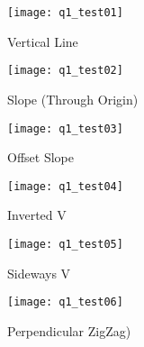 			\begin{figure}[position = here]
				\begin{centering}
					\texttt{[image: q1\_test01]}\\
					\caption[\textit{RPYAxes}]{Vertical Line}
				\end{centering}
			\end{figure}
			\newline
			
			\begin{figure}[position = here]
				\begin{centering}
					\texttt{[image: q1\_test02]}\\
					\caption[\textit{RPYAxes}]{Slope (Through Origin)}
				\end{centering}
			\end{figure}
			\newline
			
			\begin{figure}[position = here]
				\begin{centering}
					\texttt{[image: q1\_test03]}\\
					\caption[\textit{RPYAxes}]{Offset Slope}
				\end{centering}
			\end{figure}
			\newline
			
			\begin{figure}[position = here]
				\begin{centering}
					\texttt{[image: q1\_test04]}\\
					\caption[\textit{RPYAxes}]{Inverted V}
				\end{centering}
			\end{figure}
			\newline			
			
			\begin{figure}[position = here]
				\begin{centering}
					\texttt{[image: q1\_test05]}\\
					\caption[\textit{RPYAxes}]{Sideways V}
				\end{centering}
			\end{figure}
			\newline			
			
			\begin{figure}[position = here]
				\begin{centering}
					\texttt{[image: q1\_test06]}\\
					\caption[\textit{RPYAxes}]{Perpendicular ZigZag)}
				\end{centering}
			\end{figure}
			\newline			
			
